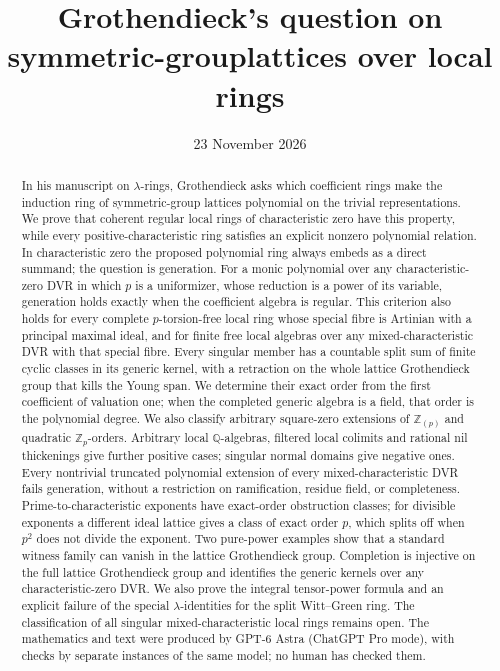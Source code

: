 \documentclass[11pt,a4paper]{article}
\title{Grothendieck's question on symmetric-group\newline lattices over local rings}
\author{}
\date{23 November 2026}
\theoremstyle{definition}\newtheorem{definition}[theorem]{Definition}
\theoremstyle{remark}\newtheorem{remark}[theorem]{Remark}
\newcommand{\Z}{\mathbb Z}\newcommand{\Q}{\mathbb Q}
\begin{document}
\maketitle
\begin{abstract}
In his manuscript on $\lambda$-rings, Grothendieck asks which coefficient
rings make the induction ring of symmetric-group lattices polynomial
on the trivial representations.  We prove that coherent regular local
rings of characteristic zero have this property, while every
positive-characteristic ring satisfies an explicit nonzero polynomial
relation.  In characteristic zero the proposed polynomial ring always
embeds as a direct summand; the question is generation.
For a monic polynomial over any characteristic-zero DVR in which $p$
is a uniformizer, whose reduction is a power of its variable,
generation holds exactly when the coefficient algebra is regular.
This criterion also holds for every complete $p$-torsion-free local
ring whose special fibre is Artinian with a principal maximal ideal,
and for finite free local algebras over any mixed-characteristic DVR
with that special fibre.  Every singular member has a countable split
sum of finite cyclic classes in its generic kernel, with a retraction
on the whole lattice Grothendieck group that kills the Young span.
We determine their exact order from the first coefficient of valuation
one; when the completed generic algebra is a field, that order is the
polynomial degree.  We also classify arbitrary square-zero extensions
of $\Z_{(p)}$ and quadratic $\Z_p$-orders.  Arbitrary local
$\Q$-algebras, filtered local colimits and rational nil thickenings
give further positive cases; singular normal domains give negative ones.
Every nontrivial truncated polynomial extension of every
mixed-characteristic DVR fails generation, without a restriction on
ramification, residue field, or completeness.  Prime-to-characteristic
exponents have exact-order obstruction classes; for divisible exponents
a different ideal lattice gives a class of exact order $p$, which
splits off when $p^2$ does not divide the exponent.
Two pure-power examples show that a standard witness family can vanish
in the lattice Grothendieck group.  Completion is injective on the full lattice Grothendieck group and
identifies the generic kernels over any characteristic-zero DVR.
We also prove the integral tensor-power formula and an explicit failure
of the special $\lambda$-identities for the split Witt--Green ring.
The classification of all singular mixed-characteristic local rings
remains open.  The mathematics and text were produced by GPT-6 Astra
(ChatGPT Pro mode), with checks by separate instances of the same model;
no human has checked them.
\end{abstract}
\end{document}
